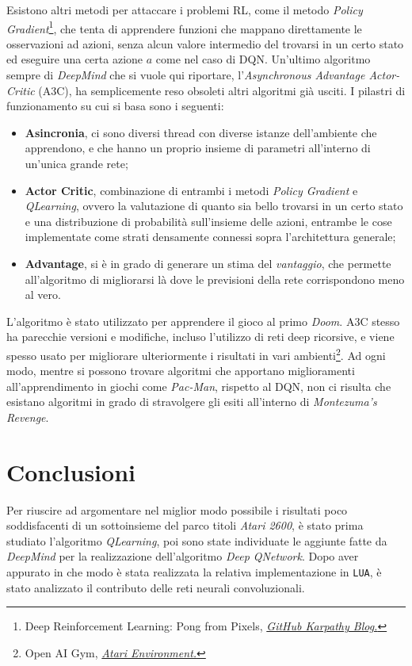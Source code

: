\documentclass[twoside,twocolumn,10pt]{extarticle}
\theoremstyle{definition}
\begin{document}
	Esistono altri metodi per attaccare i problemi RL, come il metodo \textit{Policy Gradient}\footnote{Deep Reinforcement Learning: Pong from Pixels, \emph{\href{http://karpathy.github.io/2016/05/31/rl/}{GitHub Karpathy Blog.}}}, che tenta di apprendere funzioni che mappano direttamente le osservazioni ad azioni, senza alcun valore intermedio del trovarsi in un certo stato ed eseguire una certa azione $a$ come nel caso di DQN. Un'ultimo algoritmo sempre di \textit{DeepMind} che si vuole qui riportare, l'\textit{Asynchronous Advantage Actor-Critic}\cite{bib:a3c} (A3C), ha semplicemente reso obsoleti altri algoritmi già usciti. I pilastri di funzionamento su cui si basa sono i seguenti:
	\begin{itemize}
		\item \textbf{Asincronia}, ci sono diversi thread con diverse istanze dell'ambiente che apprendono, e che hanno un proprio insieme di parametri all'interno di un'unica grande rete;
		\item \textbf{Actor Critic}, combinazione di entrambi i metodi \textit{Policy Gradient} e \textit{Q\texttwelveudash Learning}, ovvero la valutazione di quanto sia bello trovarsi in un certo stato e una distribuzione di probabilità sull'insieme delle azioni, entrambe le cose implementate come strati densamente connessi sopra l'architettura generale;
		\item \textbf{Advantage}, si è in grado di generare un stima del \textit{vantaggio}, che permette all'algoritmo di migliorarsi là dove le previsioni della rete corrispondono meno al vero.
	\end{itemize}
	L'algoritmo è stato utilizzato per apprendere il gioco al primo \textit{Doom}. A3C stesso ha parecchie versioni e modifiche, incluso l'utilizzo di reti deep ricorsive, e viene spesso usato per migliorare ulteriormente i risultati in vari ambienti\footnote{Open AI Gym, \emph{\href{https://gym.openai.com/envs\#atari}{Atari Environment.}}}. Ad ogni modo, mentre si possono trovare algoritmi che apportano miglioramenti all'apprendimento in giochi come \textit{Pac-Man}, rispetto al DQN, non ci risulta che esistano algoritmi in grado di stravolgere gli esiti all'interno di \textit{Montezuma's Revenge}.

	\section{Conclusioni}
		Per riuscire ad argomentare nel miglior modo possibile i risultati poco soddisfacenti di un sottoinsieme del parco titoli \textit{Atari 2600}, è stato prima studiato l'algoritmo \textit{Q\texttwelveudash Learning}, poi sono state individuate le aggiunte fatte da \textit{DeepMind} per la realizzazione dell'algoritmo \textit{Deep Q\texttwelveudash Network}. Dopo aver appurato in che modo è stata realizzata la relativa implementazione in \texttt{LUA}, è stato analizzato il contributo delle reti neurali convoluzionali. 
		
\end{document}
